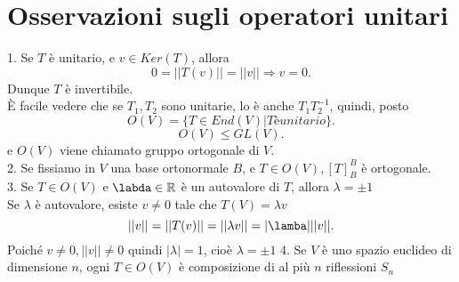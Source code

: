 \documentclass[12px]{article}
\theoremstyle{break}
\theoremstyle{break}
\theoremstyle{break}
\theoremstyle{break}
\theoremstyle{break}
\theoremstyle{break}
\begin{document}
\section{Osservazioni sugli operatori unitari}
1. Se $T$ è unitario, e $v\in Ker(T)$, allora
\[
 0 = ||T(v)|| = ||v|| \Rightarrow  v = 0
.\] 
Dunque $T$ è invertibile.\\
È facile vedere che se $T_1,T_2$ sono unitarie, lo è anche $T_1T_2^{-1}$, quindi, posto
\[
	O(V) = \{T\in End(V)| T è unitario\}
.\] 
\[
O(V) \leq GL(V)
.\] 
e $O(V)$ viene chiamato gruppo ortogonale di $V$.\\
2. Se fissiamo in  $V$ una base ortonormale $B$, e $T\in O(V), [T]^B_B$ è ortogonale.\\
3. Se $T\in O(V)$ e $\labda\in \mathbb{R}$ è un autovalore di $T$, allora $\lambda = \pm 1$ \\
Se $\lambda$ è autovalore, esiste $v\neq 0$ tale che $T(V) = \lambda v$ 
\[
||v|| = ||T(v)|| = ||\lambda v|| = |\lamba|||v||
.\] 
Poiché $v\neq 0, ||v|| \neq 0$ quindi $|\lambda| = 1$, cioè $\lambda = \pm 1$
4. Se $V$ è uno spazio euclideo di dimensione $n$, ogni $T\in O(V)$ è composizione di al più $n$ riflessioni $S_n$\\
\end{document}
